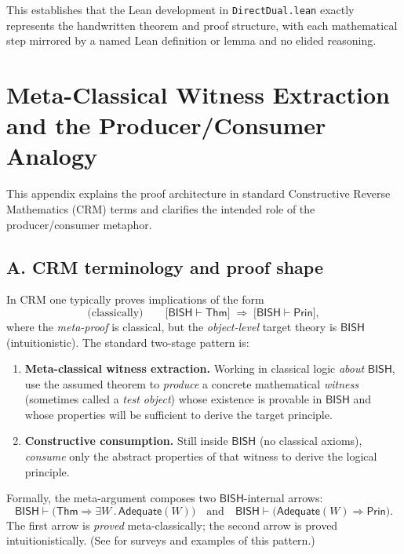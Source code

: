 \documentclass[11pt]{article}
\begin{document}
\medskip
This establishes that the Lean development in \texttt{DirectDual.lean} exactly represents the handwritten theorem and proof structure, with each mathematical step mirrored by a named Lean definition or lemma and no elided reasoning.

\section{Meta-Classical Witness Extraction and the Producer/Consumer Analogy}
\label{app:MetaWitnessPC}

This appendix explains the proof architecture in standard Constructive Reverse Mathematics (CRM) terms and clarifies the intended role of the producer/consumer metaphor.

\subsection*{A. CRM terminology and proof shape}

In CRM one typically proves implications of the form
\[
\text{(classically)}\qquad \big[\mathsf{BISH} \vdash \mathsf{Thm}\big] \;\Longrightarrow\; \big[\mathsf{BISH} \vdash \mathsf{Prin}\big],
\]
where the \emph{meta-proof} is classical, but the \emph{object-level} target theory is $\mathsf{BISH}$ (intuitionistic). The standard two-stage pattern is:
\begin{enumerate}
\item \textbf{Meta-classical witness extraction.}
Working in classical logic \emph{about} $\mathsf{BISH}$, use the assumed theorem to \emph{produce} a concrete mathematical \emph{witness} (sometimes called a \emph{test object}) whose existence is provable in $\mathsf{BISH}$ and whose properties will be sufficient to derive the target principle.
\item \textbf{Constructive consumption.}
Still inside $\mathsf{BISH}$ (no classical axioms), \emph{consume} only the abstract properties of that witness to derive the logical principle.
\end{enumerate}

Formally, the meta-argument composes two $\mathsf{BISH}$-internal arrows:
\[
\mathsf{BISH} \vdash \big(\mathsf{Thm} \Rightarrow \exists W\,.\,\mathsf{Adequate}(W)\big)
\quad\text{and}\quad
\mathsf{BISH} \vdash \big(\mathsf{Adequate}(W)\Rightarrow \mathsf{Prin}\big).
\]
The first arrow is \emph{proved} meta-classically; the second arrow is proved intuitionistically. (See \cite{Ishihara06,DienerCRM,Ishihara90} for surveys and examples of this pattern.)
\end{document}
